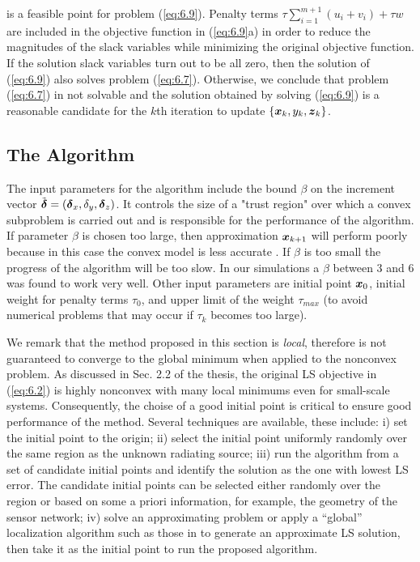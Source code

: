 \noindent
is a feasible point for problem (\ref{eq:6.9}). Penalty terms $\tau\sum_{i=1}^{m+1} \left(u_i + v_i\right) +\tau w$ are included in the objective function in (\ref{eq:6.9}a) in order to reduce the magnitudes of the slack variables while minimizing the original objective function. If the solution slack variables turn out to be all zero, then the solution  of (\ref{eq:6.9}) also solves problem (\ref{eq:6.7}). Otherwise, we conclude that problem (\ref{eq:6.7}) in not solvable and the solution obtained by solving (\ref{eq:6.9}) is a reasonable candidate for the $k$th iteration to update $\{\mbox{\boldmath$x$}_k, y_k, \mbox{\boldmath$z$}_k\}$.

\subsection{The Algorithm}

The input parameters for the algorithm include the bound $\beta$ on the increment vector $\tilde{\mbox{\boldmath${\delta}$}} =\left(
\mbox{\boldmath${\delta}$}_x, \delta_y, \mbox{\boldmath${\delta}$}_z\right)$. It controls the size of a "trust region" over which a convex subproblem is carried out and is responsible for the performance of the algorithm. If parameter $\beta$ is chosen too large, then approximation $\mbox{\boldmath$x$}_{k+1}$ will perform poorly because in this case the convex model is less accurate \cite{OPTII}. If $\beta$ is too small the progress of the algorithm will be too slow. In our simulations a $\beta$ between 3 and 6 was found to work very well. Other input parameters are initial point $\mbox{\boldmath$x$}_0$, initial weight for penalty terms $\tau_0$, and upper limit of the weight  $\tau_{max}$ (to avoid numerical problems that may occur  if $\tau_k$ becomes too large).

We remark that the method proposed in this section is \textit{local}, therefore is not guaranteed to converge to the global minimum when applied to the nonconvex problem. As discussed in Sec. 2.2 of the thesis, the original LS objective in (\ref{eq:6.2}) is highly nonconvex with many local minimums even for small-scale systems. Consequently, the choise of a good initial point is critical to ensure good performance of the method. Several techniques are available, these include: i) set the initial point to the origin; ii) select the initial point uniformly randomly over the same region as the unknown radiating source; iii) run the algorithm from a set of candidate initial points and identify the solution as the one with lowest LS error.  The candidate initial points can be selected either randomly over the region or based on some  a priori information, for example, the geometry of the sensor network; iv) solve an approximating problem or apply a “global” localization algorithm such as those in \cite{BeckStLi} to generate an approximate LS solution, then take it as the initial point to run the proposed algorithm. 

